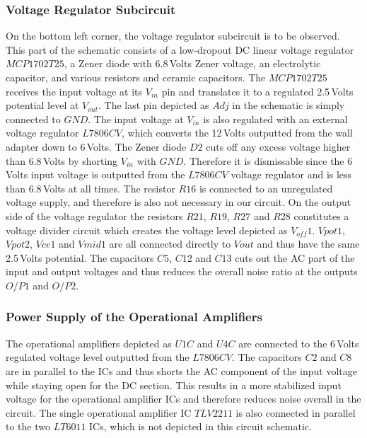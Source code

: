 \subsubsection{Voltage Regulator Subcircuit}
On the bottom left corner, the voltage regulator subcircuit is to be observed. This part of the schematic consists of a low-dropout DC linear voltage regulator $MCP1702T25$, a Zener diode with 6.8\,Volts Zener voltage, an electrolytic capacitor, and various resistors and ceramic capacitors. The $MCP1702T25$ receives the input voltage at its $V_{in}$ pin and translates it to a regulated 2.5\,Volts potential level at $V_{out}$. The last pin depicted as $Adj$ in the schematic is simply connected to $GND$. The input voltage at $V_{in}$ is also regulated with an external voltage regulator $L7806CV$, which converts the 12\,Volts outputted from the wall adapter down to 6\,Volts. The Zener diode $D2$ cuts off any excess voltage higher than 6.8\,Volts by shorting $V_{in}$ with $GND$. Therefore it is dismissable since the 6\,Volts input voltage is outputted from the $L7806CV$ voltage regulator and is less than 6.8\,Volts at all times. The resistor $R16$ is connected to an unregulated voltage supply, and therefore is also not necessary in our circuit. On the output side of the voltage regulator the resistors $R21$, $R19$, $R27$ and $R28$ constitutes a voltage divider circuit which creates the voltage level depicted as $V_{off}1$. $V{pot}1$, $V{pot}2$, $V{ce}1$ and $V{mid}1$ are all connected directly to $V{out}$ and thus have the same 2.5\,Volts potential. The capacitors $C5$, $C12$ and $C13$ cuts out the AC part of the input and output voltages and thus reduces the overall noise ratio at the outputs $O/P1$ and $O/P2$.

\subsubsection{Power Supply of the Operational Amplifiers}

The operational amplifiers depicted as $U1C$ and $U4C$ are connected to the 6\,Volts regulated voltage level outputted from the $L7806CV$. The capacitors $C2$ and $C8$ are in parallel to the ICs and thus shorts the AC component of the input voltage while staying open for the DC section. This results in a more stabilized input voltage for the operational amplifier ICs and therefore reduces noise overall in the circuit. The single operational amplifier IC $TLV2211$ is also connected in parallel to the two $LT6011$ ICs, which is not depicted in this circuit schematic.

